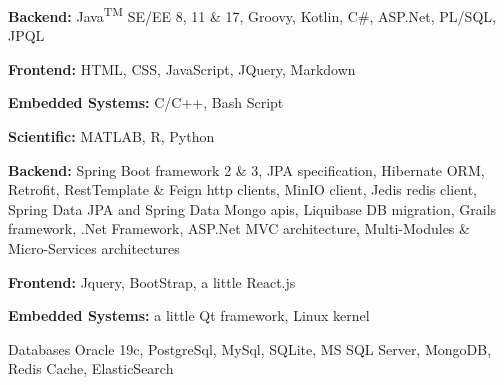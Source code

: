 

\begin{cvskills}

\cvskill
  {} %
  { %
    \begin{cvitems} %
      \item {\textbf{Backend:} Java\textsuperscript{TM} SE/EE 8, 11 \& 17, Groovy, Kotlin, C\#, ASP.Net, PL/SQL, JPQL}
      \item {\textbf{Frontend:} HTML, CSS, JavaScript, JQuery, Markdown}
      \item {\textbf{Embedded Systems:} C/C++, Bash Script}
      \item {\textbf{Scientific:} MATLAB, R, Python}
    \end{cvitems}
  } 
  
\cvskill
  {} %
  { %
    \begin{cvitems} %
      \item {\textbf{Backend:} Spring Boot framework 2 \& 3, JPA specification, Hibernate ORM, Retrofit, RestTemplate \& Feign http clients, MinIO client, Jedis redis client, Spring Data JPA and Spring Data Mongo apis, Liquibase DB migration, Grails framework, .Net Framework, ASP.Net MVC architecture, Multi-Modules \& Micro-Services architectures}
      \item {\textbf{Frontend:} Jquery, BootStrap, a little React.js}
      \item {\textbf{Embedded Systems:} a little Qt framework, Linux kernel}
    \end{cvitems}
  }

\cvskill
  {Databases} %
  {Oracle 19c, PostgreSql, MySql, SQLite, MS SQL Server, MongoDB, Redis Cache, ElasticSearch} %
  

\end{cvskills}
